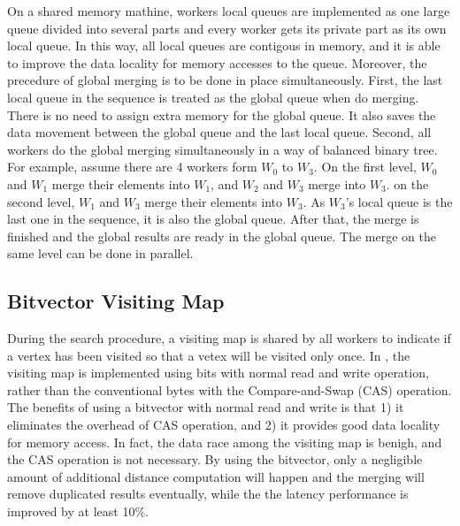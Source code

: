 On a shared memory mathine, workers local queues are implemented as one large queue divided into several parts and every worker gets its private part as its own local queue. In this way, all local queues are contigous in memory, and it is able to improve the data locality for memory accesses to the queue. 
Moreover, the precedure of global merging is to be done in place simultaneously.
First, the last local queue in the sequence is treated as the global queue when do merging. There is no need to assign extra memory for the global queue. It also saves the data movement between the global queue and the last local queue.
Second, all workers do the global merging simultaneously in a way of balanced binary tree. For example, assume there are 4 workers form $W_0$ to $W_3$. On the first level, $W_0$ and $W_1$ merge their elements into $W_1$, and $W_2$ and $W_3$ merge into $W_3$. on the second level, $W_1$ and $W_3$ merge their elements into $W_3$. As $W_3$'s local queue is the last one in the sequence, it is also the global queue. After that, the merge is finished and the global results are ready in the global queue. The merge on the same level can be done in parallel.

\subsection{Bitvector Visiting Map}

During the search procedure, a visiting map is shared by all workers to indicate if a vertex has been visited so that a vetex will be visited only once.
In \ShortName, the visiting map is implemented using bits with normal read and write operation, rather than the conventional bytes with the Compare-and-Swap (CAS) operation.
The benefits of using a bitvector with normal read and write is that 1) it eliminates the overhead of CAS operation, and 2) it provides good data locality for memory access.
In fact, the data race among the visiting map is benigh, and the CAS operation is not necessary. 
By using the bitvector, only a negligible amount of additional distance computation will happen and the merging will remove duplicated results eventually, while the the latency performance is improved by at least 10\%. 


